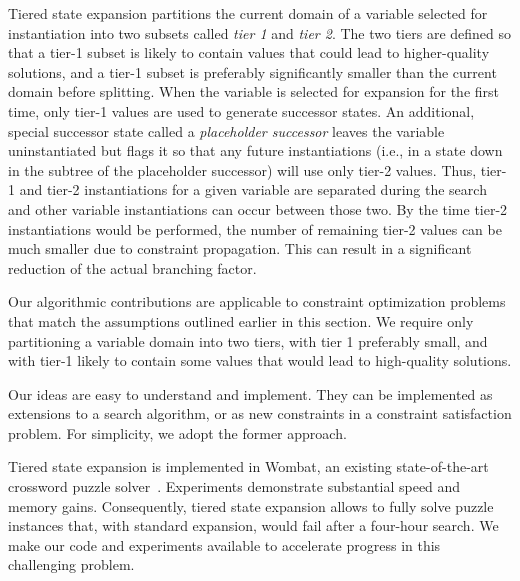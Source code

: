 Tiered state expansion partitions the current domain of a variable selected for instantiation
into two subsets called {\em tier 1} and {\em tier 2}.
The two tiers are defined so that a tier-1 subset is likely to contain values that could
lead to higher-quality solutions, and a tier-1 subset is preferably significantly smaller than the current domain before splitting.
When the variable is selected for expansion for the first time,
only tier-1 values are used to generate successor states.
An additional, special successor state called a \emph{placeholder successor}
leaves the variable uninstantiated but flags it so that any future instantiations
(i.e., in a state down in the subtree of the placeholder successor)
will use only tier-2 values.
Thus, tier-1 and tier-2 instantiations 
for a given variable are separated during the search
and other variable instantiations can occur between those two.
By the time tier-2 instantiations would be performed,
the number of remaining tier-2 values can be much smaller
due to constraint propagation.
This can result in a significant reduction of the actual
branching factor.

Our algorithmic contributions are applicable to constraint optimization problems that match
the assumptions outlined earlier in this section.
We require only partitioning a variable domain into two tiers,
with tier 1 preferably small, 
and with 
tier-1 likely to contain some values that would lead to high-quality solutions.

Our ideas are easy to understand and implement.
They can be implemented as extensions to a search algorithm,
or as new constraints in a constraint satisfaction problem.
For simplicity, we adopt the former approach.

Tiered state expansion is implemented in {\sc Wombat}, an existing state-of-the-art crossword puzzle solver~\cite{DBLP:conf/socs/BoteaB21}.
Experiments demonstrate substantial speed and memory gains. Consequently, tiered state expansion allows to fully solve puzzle instances that,
with standard expansion, would fail after a four-hour search.
We make our code and experiments available to
accelerate progress
in this challenging problem.

\begin{comment}
The rest of the paper is organized as follows.
First we review related work, followed by the problem formulation.
Then we present the Romanian Crosswords Competition,
followed by a background on constraint optimization as a search problem.
We present the tiered state expansion in detail,
and evaluate it on Romanian Crosswords puzzle instances.
We end with future work and concluding remarks.
\end{comment}